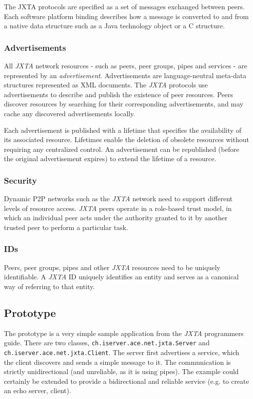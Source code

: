 The JXTA protocols are specified as a set of messages exchanged between peers. Each software platform binding describes how a message is converted to and from a native data structure such as a Java technology object or a C structure. 

\subsubsection{Advertisements}
All \emph{JXTA} network resources - such as peers, peer groups, pipes and services - are represented by an \emph{advertisement}. Advertisements are language-neutral meta-data structures represented as XML documents. The \emph{JXTA} protocols use advertisements to describe and publish the existence of peer resources. Peers discover resources by searching for their corresponding advertisements, and may cache any discovered advertisements locally.

Each advertisement is published with a lifetime that specifies the availability of its associated resource. Lifetimes enable the deletion of obsolete resources without requiring any centralized control. An advertisement can be republished (before the original advertisement expires) to extend the lifetime of a resource.

\subsubsection{Security}
Dynamic P2P networks such as the \emph{JXTA} network need to support different levels of resource access. \emph{JXTA} peers operate in a role-based trust model, in which an individual peer acts under the authority granted to it by another trusted peer to perform a particular task. 

\subsubsection{IDs}
Peers, peer groups, pipes and other \emph{JXTA} resources need to be uniquely identifiable. A \emph{JXTA} ID uniquely identifies an entity and serves as a canonical way of referring to that entity. 



\subsection{Prototype}
The prototype is a very simple sample application from the \emph{JXTA} programmers guide. There are two classes, \texttt{ch.iserver.ace.net.jxta.Server} and \texttt{ch.iserver.ace.net.jxta.Client}. The server first advertises a service, which the client discovers and sends a simple message to it. The communication is strictly unidirectional (and unreliable, as it is using pipes). The example could certainly be extended to provide a bidirectional and reliable service (e.g. to create an echo server, client).

